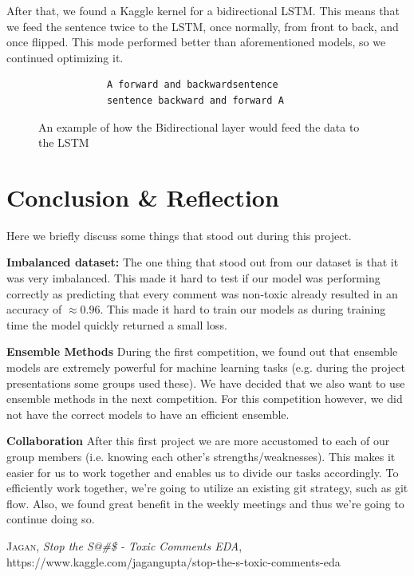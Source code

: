 \documentclass[10pt, a4paper]{article}
\begin{document}
\begin{multicols}{2}
		After that, we found a Kaggle kernel for a bidirectional LSTM. This means that we feed the sentence twice to the LSTM, once normally, from front to back, and once flipped. This mode performed better than aforementioned models, so we continued optimizing it.
		
		\begin{figure}
			\begin{verbatim}	
			A forward and backwardsentence
			sentence backward and forward A
			\end{verbatim}
			\caption{An example of how the  Bidirectional layer would feed the data to the LSTM}
		\end{figure}
		
		
		
		\section{Conclusion & Reflection}
		Here we briefly discuss some things that stood out during this project.
		
		\textbf{Imbalanced dataset:} The one thing that stood out from our dataset is that it was very imbalanced. This made it hard to test if our model was performing correctly as predicting that every comment was non-toxic already resulted in an accuracy of $\approx 0.96$. This made it hard to train our models as during training time the model quickly returned a small loss.
		
		\textbf{Ensemble Methods} During the first competition, we found out that ensemble models are extremely powerful for machine learning tasks (e.g. during the project presentations some groups used these). We have decided that we also want to use ensemble methods in the next competition. For this competition however, we did not have the correct models to have an efficient ensemble.
		
		\textbf{Collaboration} After this first project we are more accustomed to each of our group members (i.e. knowing each other's strengths/weaknesses). This makes it easier for us to work together and enables us to divide our tasks accordingly. To efficiently work together, we're going to utilize an existing git strategy, such as git flow. Also, we found great benefit in the weekly meetings and thus we're going to continue doing so.
		\begin{thebibliography}{xx}
			\textsc{Jagan}, \textit{Stop the S@\#\$ - Toxic Comments EDA},
			https://www.kaggle.com/jagangupta/stop-the-s-toxic-comments-eda
		\end{thebibliography}
		
		
	\end{multicols}
	
\end{document}
